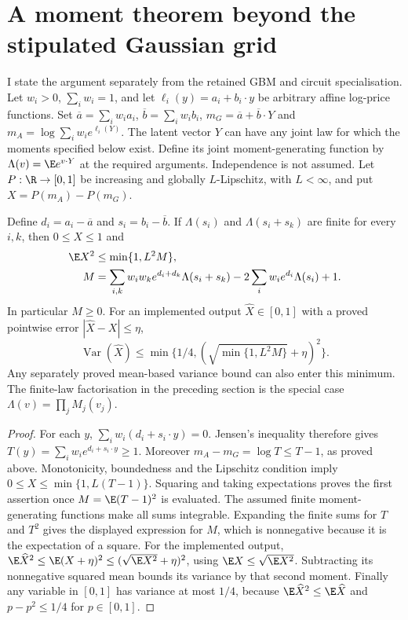 \section{A moment theorem beyond the stipulated Gaussian grid}
\label{sec:general-moment}

I state the argument separately from the retained GBM and circuit
specialisation. Let $w_i>0$, $\sum_iw_i=1$, and let
$\ell_i(y)=a_i+b_i\cdot y$ be arbitrary affine log-price functions.
Set $\overline a=\sum_iw_i a_i$,
$\overline b=\sum_iw_i b_i$, $m_G=\overline a+\overline b\cdot Y$ and
$m_A=\log\sum_iw_i e^{\ell_i(Y)}$. The latent vector $Y$ can have any
joint law for which the moments specified below exist. Define its joint
moment-generating function by
$\Lambda(v)=\E e^{v\cdot Y}$ at the required arguments. Independence
is not assumed. Let $P:\R\to[0,1]$ be increasing and globally
$L$-Lipschitz, with $L<\infty$, and put
$X=P(m_A)-P(m_G)$.

\begin{theorem}\label{thm:general-moment}
Define $d_i=a_i-\overline a$ and $s_i=b_i-\overline b$. If
$\Lambda(s_i)$ and $\Lambda(s_i+s_k)$ are finite for every $i,k$, then
$0\leq X\leq1$ and
\begin{align}
 \E X^2&\leq\min\{1,L^2M\},\\
 M&=\sum_{i,k}w_iw_k e^{d_i+d_k}\Lambda(s_i+s_k)
       -2\sum_iw_i e^{d_i}\Lambda(s_i)+1.
\end{align}
In particular $M\geq0$. For an implemented output $\widehat X\in[0,1]$
with a proved pointwise error $|\widehat X-X|\leq\eta$,
\begin{equation}
 \operatorname{Var}(\widehat X)
 \leq\min\{1/4,(\sqrt{\min\{1,L^2M\}}+\eta)^2\}.
\end{equation}
Any separately proved mean-based variance bound can also enter this
minimum. The finite-law factorisation in the preceding section is the
special case $\Lambda(v)=\prod_jM_j(v_j)$.
\end{theorem}

\begin{proof}
For each $y$, $\sum_iw_i(d_i+s_i\cdot y)=0$. Jensen's inequality therefore
gives $T(y)=\sum_iw_i e^{d_i+s_i\cdot y}\geq1$.
Moreover $m_A-m_G=\log T\leq T-1$, as proved above. Monotonicity,
boundedness and the Lipschitz condition imply
$0\leq X\leq\min\{1,L(T-1)\}$. Squaring and taking expectations proves
the first assertion once $M=\E(T-1)^2$ is evaluated. The assumed
finite moment-generating functions make all sums integrable. Expanding
the finite sums for $T$ and $T^2$ gives the displayed expression for $M$,
which is nonnegative because it is the expectation of a square.
For the implemented output,
$\E\widehat X^2\leq\E(X+\eta)^2
\leq(\sqrt{\E X^2}+\eta)^2$, using
$\E X\leq\sqrt{\E X^2}$. Subtracting its nonnegative squared mean
bounds its variance by that second moment. Finally any variable in
$[0,1]$ has variance at most $1/4$, because
$\E \widehat X^2\leq\E\widehat X$ and
$p-p^2\leq1/4$ for $p\in[0,1]$.
\end{proof}

